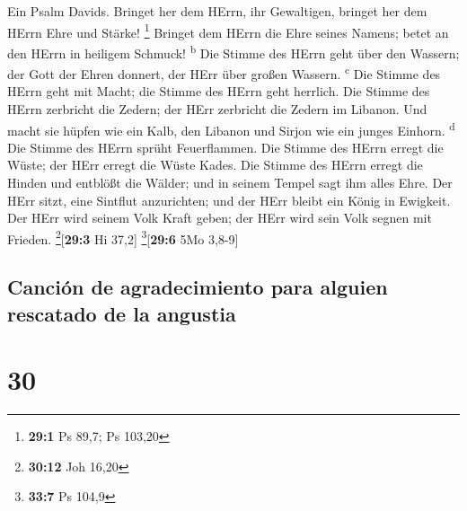  Ein Psalm Davids. Bringet her dem HErrn, ihr Gewaltigen,
bringet her dem HErrn Ehre und Stärke! \footnote{\textbf{29:1} Ps 89,7;
  Ps 103,20}  Bringet dem HErrn die Ehre seines Namens;
betet an den HErrn in heiligem Schmuck! \textsuperscript{b}
 Die Stimme des HErrn geht über den Wassern; der Gott der
Ehren donnert, der HErr über großen Wassern. \textsuperscript{c}
 Die Stimme des HErrn geht mit Macht; die Stimme des HErrn
geht herrlich.  Die Stimme des HErrn zerbricht die Zedern;
der HErr zerbricht die Zedern im Libanon.  Und macht sie
hüpfen wie ein Kalb, den Libanon und Sirjon wie ein junges Einhorn.
\textsuperscript{d}  Die Stimme des HErrn sprüht
Feuerflammen.  Die Stimme des HErrn erregt die Wüste; der
HErr erregt die Wüste Kades.  Die Stimme des HErrn erregt
die Hinden und entblößt die Wälder; und in seinem Tempel sagt ihm alles
Ehre.  Der HErr sitzt, eine Sintflut anzurichten; und der
HErr bleibt ein König in Ewigkeit.  Der HErr wird seinem
Volk Kraft geben; der HErr wird sein Volk segnen mit Frieden.
\footnote{\textbf{30:12} Joh 16,20}{[}\textbf{29:3} Hi 37,2{]}
\footnote{\textbf{33:7} Ps 104,9}{[}\textbf{29:6} 5Mo 3,8-9{]}

\hypertarget{canciuxf3n-de-agradecimiento-para-alguien-rescatado-de-la-angustia}{%
\subsection{Canción de agradecimiento para alguien rescatado de la
angustia}\label{canciuxf3n-de-agradecimiento-para-alguien-rescatado-de-la-angustia}}

\hypertarget{section-29}{%
\section{30}\label{section-29}}

